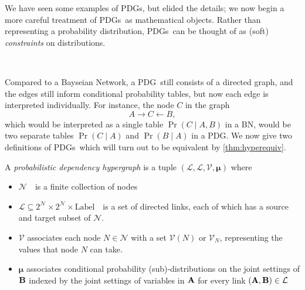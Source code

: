 \documentclass{article}
\newcommand\changeon{\color{note-fg} }
\newcommand\bmu{\boldsymbol{\mu}}
\newcommand{\V}{\mathcal V}
\newcommand{\N}{\mathcal N}
\newcommand{\Li}{\mathcal L}
\newcommand{\modelnamehyper}{probabilistic dependency hypergraph}
\newcommand{\MN}{PDG}
\newcommand{\MNH}{PDH}
\newcommand{\MNs}{\MN s}
\begin{document}
	\changeon
	We have seen some examples of \MNs, but elided the details; we now begin a more careful treatment of \MNs\ as mathematical objects. Rather than representing a probability distribution, \MNs\ can be thought of as (soft) \emph{constraints} on distributions.

	
	
	
	
	\todo\
	
	
	Compared to a Bayseian Network, a \MN\ still consists of a directed graph, and the edges still inform conditional probability tables, but now each edge is interpreted individually. For instance, the node $C$ in the graph
	\[ A \!\rightarrow\! C \!\leftarrow\! B,\]
	which would be interpreted as a single table $\Pr(C\mid A, B)$ in a BN, would be two separate tables $\Pr(C \mid A)$ and $\Pr(B \mid A)$ in a \MN. We now give two definitions of \MNs\, which will turn out to be equivalent by \cref{thm:hyperequiv}.

	
	\def\mnvars[#1]{(\mathcal L#1, \mathcal L#1, \mathcal V#1, \bmu#1)}
	\begin{defn}[\MNH]\label{def:hypermodel}
		A \emph{\modelnamehyper} is a tuple $\mnvars[]$ where
		\begin{itemize}[nosep]
			\item $\N$~~is a finite collection of nodes
			\item $\Li \subseteq 2^{\N} \times 2^{\N} \times \mathrm{Label}$~~is a set of directed links, each of which has a source and target subset of $\N$.
			\item $\V$ associates each node $N \in \mathcal N$ with a set $\V(N)$ or $\V_N$, representing the values that node $N$ can take.
			\item $\bmu$
			associates conditional probability (sub)-distributions on the joint settings of $\bf B$ indexed by the joint settings of variables in $\bf A$ for every link $({\bf A,B}) \in \mathcal L$ %
		\end{itemize}

	\end{defn}
\end{document}
